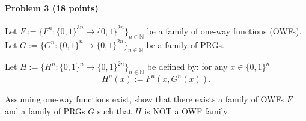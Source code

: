 \paragraph{Problem 3 (18 points)}


Let $F:=\{ F^n: \{0,1\}^{3n} \to \{0,1\}^{2n}  \}_{n\in\mathbb{N}}$ be a family of one-way functions (OWFs). 
Let $G:=\{ G^n: \{0,1\}^n \to \{0,1\}^{2n}  \}_{n\in\mathbb{N}}$ be a family of PRGs. 

Let $H:=\{ H^n: \{0,1\}^{n} \to \{0,1\}^{2n} \}_{n\in\mathbb{N}}$ be defined by: for any $x\in\{0,1\}^n$ 
\[ H^n(x) := F^{n}( x, G^n(x) ) .  \]

Assuming one-way functions exist, show that there exists a family of OWFs $F$ and a family of PRGs $G$ such that $H$ is NOT a OWF family.